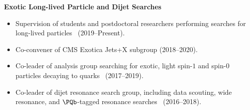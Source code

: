 \documentclass[11pt]{res}
\begin{document}
\begin{resume}
  \textbf{Exotic Long-lived Particle and Dijet Searches}
  \begin{itemize}
    \itemsep-0.3em
    \item Supervision of students and postdoctoral researchers performing searches for long-lived particles~\cite{CMS:2024ake,CMS:2024bvl,CMS:2022wjc,CMS:2021yhb,CMS:2021juv} ({2019--Present}).
    \item Co-convener of CMS Exotica Jets+X subgroup ({2018--2020}).
    \item Co-leader of analysis group searching for exotic, light spin-$1$ and spin-$0$ particles decaying to quarks~\cite{Sirunyan:2019vxa,Sirunyan:2019sgo,Sirunyan:2018ikr,Sirunyan:2017nvi} ({2017--2019}).
    \item Co-leader of dijet resonance search group, including data scouting, wide resonance, and $\PQb$-tagged resonance searches~\cite{Sirunyan:2019pnb,Sirunyan:2019vgj,CMS-PAS-EXO-17-026,Duarte:2018bsd,Sirunyan:2018xlo,Sirunyan:2016iap} ({2016--2018}).
  \end{itemize}


\end{resume}
\end{document}
